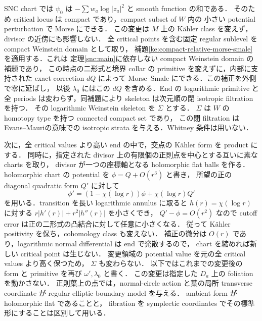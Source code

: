 SNC chart では $\psi_0$ は $-\sum w_a\log|z_a|^2$ と smooth function の和である．
そのため critical locus は compact であり，compact subset of $W$ 内の
小さい potential perturbation で Morse にできる．
この変更は $M$ 上の Kähler class を変えず，divisor の近傍にも影響しない．
全 critical points を含む固定 regular sublevel を compact Weinstein domain として取り，
補題\ref{ke:compact-relative-morse-smale}を適用する．これは
定理\ref{snc:main}に依存しない compact Weinstein domain の補題であり，
この時点の二形式と境界 collar の primitive を変えずに，内部に支持された
exact correction $dQ$ によって Morse--Smale にできる．この補正を外側で零に延ばし，
以後 $\lambda_0$ にはこの $dQ$ を含める．End の logarithmic primitive と全 periods
は変わらず，同補題により skeleton は次元順の閉 isotropic filtration を持つ．
その logarithmic Weinstein skeleton を $\Sigma$ とする．
$\Sigma$ は $W$ の homotopy type を持つ connected compact set であり，
この閉 filtration は Evans--Mauri\cite[Definitions~2.1 and 2.5]{EM}の意味での
isotropic strata を与える．Whitney 条件は用いない．

次に，全 critical values より高い end の中で，交点の Kähler form を product にする．
同時に，指定された divisor 上の有限個の正則点を中心とする互いに素な charts を取り，
divisor が一つの座標軸となる holomorphic flat balls を作る．
holomorphic chart の potential を $\phi=Q+O(r^3)$ と書き，
所望の正の diagonal quadratic form $Q'$ に対して
\[
 \phi'=(1-\chi(\log r))\phi+\chi(\log r)Q'
\]
を用いる．transition を長い logarithmic annulus に取ると
$h(r)=\chi(\log r)$ に対する $r|h'(r)|+r^2|h''(r)|$ を小さくでき，
$Q'-\phi=O(r^2)$ なので cutoff error は正の二形式の凸結合に対して任意に小さくなる．
従って Kähler positivity を保ち，cohomology class も変えない．
補正の微分は $O(r)$ であり，logarithmic normal differential は end で発散するので，
chart を縮めれば新しい critical point は生じない．
変更領域の potential value を元の全 critical values より高く保つため，
$\Sigma$ も変わらない．
以下ではこれまでの変更後の form と primitive を再び $\omega',\lambda_0$ と書く．
この変更は指定した $D_a$ 上の foliation を動かさない．
正則葉上の点では，normal-circle action と葉の局所 transverse coordinate が
regular elliptic-boundary model を与える．
ambient form が holomorphic flat であることと，
fibration を symplectic coordinates でその標準形にすることは区別して用いる．

